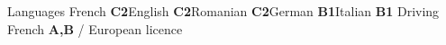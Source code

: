 
\begin{cvskills}[0.85]
	\cvskill
	{Languages}
	{French \textbf{C2}\allowbreak\hspace{0.6em}English \textbf{C2}\allowbreak\hspace{0.6em}Romanian \textbf{C2}\allowbreak\hspace{0.6em}German \textbf{B1}\allowbreak\hspace{0.6em}Italian \textbf{B1}}
	\cvskill
	{Driving}
	{French \textbf{A,B} / European licence}
\end{cvskills}
